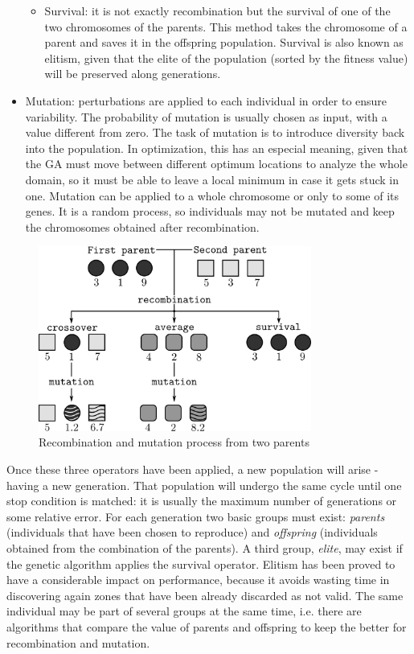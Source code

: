 \begin{itemize}
\begin{itemize}
            \item Survival: it is not exactly recombination but the survival of one of the two chromosomes of the parents. This method takes the chromosome of a parent and saves it in the offspring population. Survival is also known as elitism, given that the elite of the population (sorted by the fitness value) will be preserved along generations.
        \end{itemize}
        \item Mutation: perturbations are applied to each individual in order to ensure variability. The probability of mutation is usually chosen as input, with a value different from zero. The task of mutation is to introduce diversity back into the population. In optimization, this has an especial meaning, given that the GA must move between different optimum locations to analyze the whole domain, so it must be able to leave a local minimum in case it gets stuck in one. Mutation can be applied to a whole chromosome or only to some of its genes. It is a random process, so individuals may not be mutated and keep the chromosomes obtained after recombination.
    \end{itemize}
    
    \begin{figure}[h!]
        \centering
        \includegraphics[width=0.8\textwidth]{Figures/2/crossover.png}
        \caption{Recombination and mutation process from two parents}
        \label{fig:crossoverTheory}
    \end{figure}

    Once these three operators have been applied, a new population will arise - having a new generation. That population will undergo the same cycle until one stop condition is matched: it is usually the maximum number of generations or some relative error. For each generation two basic groups must exist: \textit{parents} (individuals that have been chosen to reproduce) and \textit{offspring} (individuals obtained from the combination of the parents). A third group, \textit{elite}, may exist if the genetic algorithm applies the survival operator. Elitism \cite{yager2012introduction} has been proved to have a considerable impact on performance, because it avoids wasting time in discovering again zones that have been already discarded as not valid. The same individual may be part of several groups at the same time, i.e. there are algorithms that compare the value of parents and offspring to keep the better for recombination and mutation.

